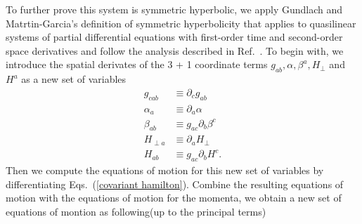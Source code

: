 \documentclass[letterpaper,nofootinbib,prd,amsmath,onecolumn]{revtex4-1}
\begin{document}
To further prove this system is symmetric hyperbolic, we apply Gundlach and Matrtin-Garcia\cite{Gundlach:2005ta}'s definition of symmetric hyperbolicity that applies to quasilinear systems of partial differential equations with first-order time and second-order space derivatives and follow the analysis described in Ref.~\cite{Brown:2011qg}. To begin with, we introduce the spatial derivates of the 3 + 1 coordinate terms $g_{ab}, \alpha, \beta^{a}, H_{\perp}$ and $H^{a}$ as a new set of variables
\begin{subequations}
\begin{align}
g_{cab} & \equiv \partial_{c}g_{ab}\\
\alpha_{a} & \equiv \partial_{a}\alpha\\
\beta_{ab} & \equiv g_{ac}\partial_{b}\beta^{c}\\
H_{\perp a} & \equiv \partial_{a}H_{\perp}\\
H_{ab} & \equiv g_{ac}\partial_{b}H^{c}.
\end{align}
\end{subequations}
Then we compute the equations of motion for this new set of variables by differentiating Eqs.~(\ref{covariant hamilton}). Combine the resulting equations of motion with the equations of motion for the momenta, we obtain a new set of equations of montion as following(up to the principal terms)
\end{document}
